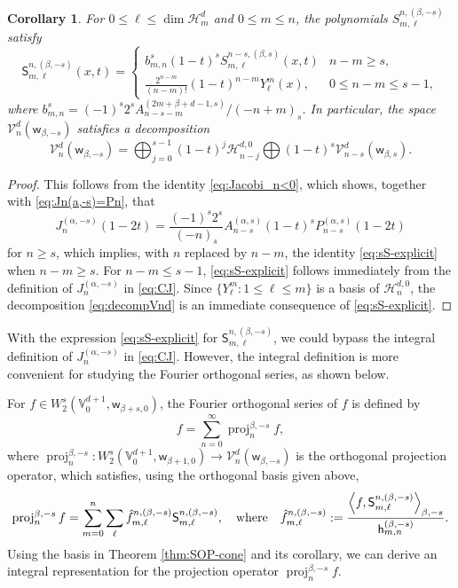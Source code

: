 \documentclass{amsart}
\newtheorem{cor}[thm]{Corollary}
\theoremstyle{remark}
\def\sh{{\mathsf h}}
\def\sw{{\mathsf w}}
\def\sS{{\mathsf S}}
\def\a{{\alpha}}
\def\b{{\beta}}
\def\CH{{\mathcal H}}
\def\CV{{\mathcal V}}
\def\VV{{\mathbb V}}
\def\proj{\operatorname{proj}}
\begin{document}
\begin{cor}
For $0 \le \ell \le \dim \CH_m^d$ and $0 \le m \le n$, the polynomials $S_{m,\ell}^{n,(\b,-s)}$ satisfy
\begin{equation}\label{eq:sS-explicit}
   \sS_{m,\ell}^{n,(\b,-s)}(x,t) = \begin{cases} b_{m,n}^s  (1- t)^s S_{m,\ell}^{n-s,(\b,s)}(x,t) & n-m \ge s, \\
           \frac{2^{n-m}}{(n-m)!}  (1-t)^{n-m} Y_\ell^m(x), &  0 \le n-m\le s-1,
\end{cases}
\end{equation}
where $b_{m,n}^s =   (-1)^s 2^s A_{n-s-m}^{(2m+\b+d-1,s)}/{(-n+m)_s}$. In particular, the space $\CV_n^d(\sw_{\b,-s})$
satisfies a decomposition
\begin{equation}\label{eq:decompVnd}
  \CV_n^d(\sw_{\b,-s}) = \bigoplus_{j=0}^{s-1} (1-t)^j \CH_{n-j}^{d,0} \bigoplus (1-t)^s \CV_{n-s}^d(\sw_{\b,s}).
\end{equation}
\end{cor}

\begin{proof}
This follows from the identity \eqref{eq:Jacobi_n<0}, which shows, together with \eqref{eq:Jn(a,-s)=Pn}, that
$$
  J_{n}^{(\a,-s)}(1-2t) = \frac{(-1)^s 2^s}{(-n)_s} A_{n-s}^{(\a,s)}(1-t)^s P_{n-s}^{(\a,s)}(1-2t)
$$
for $n\ge s$, which implies, with $n$ replaced by $n-m$, the identity \eqref{eq:sS-explicit} when $n - m \ge s$.
For $n -m \le s-1$, \eqref{eq:sS-explicit} follows immediately from the definition of $J_n^{(\a,-s)}$ in
\eqref{eq:CJ}. Since $\{Y_\ell^m: 1 \le \ell \le m\}$ is a basis of $\CH_n^{d,0}$, the decomposition
\eqref{eq:decompVnd} is an immediate consequence of \eqref{eq:sS-explicit}.
\end{proof}

With the expression \eqref{eq:sS-explicit} for $\sS_{m,\ell}^{n, (\b,-s)}$, we could bypass the integral
definition of $J_n^{(\a,-s)}$ in \eqref{eq:CJ}. However, the integral definition is more convenient for studying
the Fourier orthogonal series, as shown below.

For $f \in W_2^s(\VV_0^{d+1}, \sw_{\b+s,0})$, the Fourier orthogonal
series of $f$ is defined by
$$
  f = \sum_{n=0}^\infty \proj_n^{\b,-s} f,
$$
where $\proj_n^{\b,-s}: W_2^s(\VV_0^{d+1}, \sw_{\b+1,0}) \rightarrow \CV_n^d(\sw_{\b,-s})$ is the orthogonal
projection operator, which satisfies, using the orthogonal basis given above,
$$
  \proj_n^{\b,-s} f = \sum_{m=0}^n \sum_{\ell}\hat f_{m,\ell}^{n, (\b,-s)} \sS_{m,\ell}^{n,(\b,-s)},
  \quad \hbox{where}\quad \hat f_{m,\ell}^{n, (\b,-s)} := \frac{\left \langle f,  \sS_{m, \ell}^{n,(\b,-s)}\right \rangle_{\b,-s}}
      {\sh_{m,n}^{(\b,-s)}}.
$$
Using the basis in Theorem \ref{thm:SOP-cone} and its corollary, we can derive an integral
representation for the projection operator $\proj_n^{\b,-s} f$.
\end{document}
